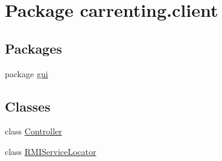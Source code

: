 \hypertarget{namespacecarrenting_1_1client}{}\section{Package carrenting.\+client}
\label{namespacecarrenting_1_1client}
\subsection*{Packages}
\begin{DoxyCompactItemize}
\item 
package \mbox{\hyperlink{namespacecarrenting_1_1client_1_1gui}{gui}}
\end{DoxyCompactItemize}
\subsection*{Classes}
\begin{DoxyCompactItemize}
\item 
class \mbox{\hyperlink{classcarrenting_1_1client_1_1_controller}{Controller}}
\item 
class \mbox{\hyperlink{classcarrenting_1_1client_1_1_r_m_i_service_locator}{R\+M\+I\+Service\+Locator}}
\end{DoxyCompactItemize}

